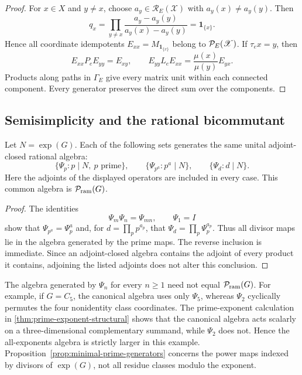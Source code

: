 \begin{proof}
For \(x\in X\) and \(y\neq x\), choose \(a_y\in\mathcal R_E(\mathscr X)\)
with \(a_y(x)\neq a_y(y)\).  Then
\[
 q_x=\prod_{y\neq x}
 \frac{a_y-a_y(y)}{a_y(x)-a_y(y)}
 =\mathbf1_{\{x\}}.
\]
Hence all coordinate idempotents \(E_{xx}=M_{\mathbf1_{\{x\}}}\) belong
to \(\mathcal P_E(\mathscr X)\).  If \(\tau_ex=y\), then
\[
 E_{xx}P_eE_{yy}=E_{xy},\qquad
 E_{yy}L_eE_{xx}=\frac{\mu(x)}{\mu(y)}E_{yx}.
\]
Products along paths in \(\Gamma_E\) give every matrix unit within each
connected component.  Every generator preserves the direct sum over the
components.
\end{proof}

\subsection{Semisimplicity and the rational bicommutant}
\label{sec:structural-theory}

\begin{proposition}
\label{prop:minimal-prime-generators}
Let \(N=\exp(G)\).  Each of the following sets generates the same unital
adjoint-closed rational algebra:
\begin{equation}
 \{\Psi_p:p\mid N,\ p\text{ prime}\},\qquad
 \{\Psi_{p^a}:p^a\mid N\},\qquad
 \{\Psi_d:d\mid N\}.
 \label{eq:equivalent-exponent-sets}
\end{equation}
Here the adjoints of the displayed operators are included in every case.
This common algebra is \(\mathcal P_{\mathrm{ram}}(G)\).
\end{proposition}

\begin{proof}
The identities
\[
 \Psi_m\Psi_n=\Psi_{mn},\qquad \Psi_1=I
\]
show that \(\Psi_{p^a}=\Psi_p^a\) and, for
\(d=\prod_p p^{a_p}\), that \(\Psi_d=\prod_p\Psi_p^{a_p}\).
Thus all divisor maps lie in the algebra generated by the prime maps.  The
reverse inclusion is immediate.  Since an adjoint-closed algebra contains
the adjoint of every product it contains, adjoining the listed adjoints
does not alter this conclusion.
\end{proof}

\begin{example}
\label{ex:all-positive-exponents}
The algebra generated by \(\Psi_n\) for every \(n\geq1\) need not equal
\(\mathcal P_{\mathrm{ram}}(G)\).  For example, if \(G=C_5\), the canonical
algebra uses only \(\Psi_5\), whereas \(\Psi_2\) cyclically permutes the
four nonidentity class coordinates.  The prime-exponent calculation in
\cref{thm:prime-exponent-structural} shows that the canonical algebra acts
scalarly on a three-dimensional complementary summand, while \(\Psi_2\)
does not.  Hence the all-exponents algebra is strictly larger in this
example.  Proposition~\ref{prop:minimal-prime-generators} concerns the
power maps indexed by divisors of \(\exp(G)\), not all residue classes
modulo the exponent.
\end{example}


